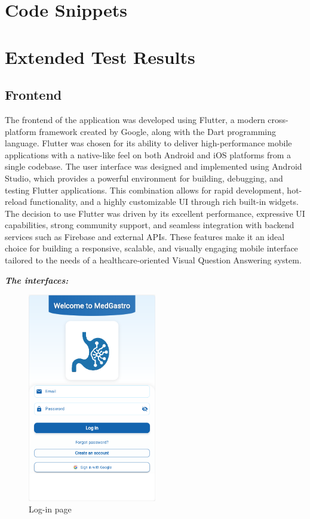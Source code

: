 \documentclass[12pt,a4paper]{report}
\begin{document}
\appendix
\chapter{Code Snippets}

\chapter{Extended Test Results}

\section{Frontend}
The frontend of the application was developed using Flutter, a modern cross-platform framework created by Google, along with the Dart programming language. Flutter was chosen for its ability to deliver high-performance mobile applications with a native-like feel on both Android and iOS platforms from a single codebase. The user interface was designed and implemented using Android Studio, which provides a powerful environment for building, debugging, and testing Flutter applications. This combination allows for rapid development, hot-reload functionality, and a highly customizable UI through rich built-in widgets. The decision to use Flutter was driven by its excellent performance, expressive UI capabilities, strong community support, and seamless integration with backend services such as Firebase and external APIs. These features make it an ideal choice for building a responsive, scalable, and visually engaging mobile interface tailored to the needs of a healthcare-oriented Visual Question Answering system.

\clearpage
\textbf{\textit{The interfaces:}}

\begin{figure}[H] %
    \centering
    \includegraphics[width=0.5\textwidth]{i11.png}
    \caption{Log-in page}
    \label{fig:login-page}
\end{figure}
\end{document}
